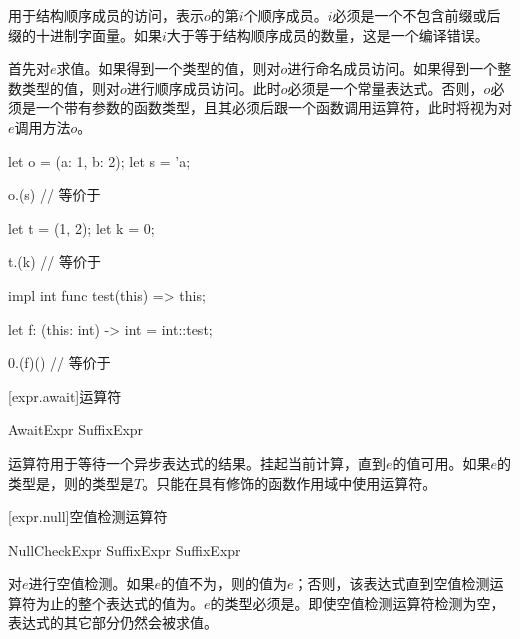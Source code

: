 \pnum
{}用于结构顺序成员的访问，表示$o$的第$i$个顺序成员。$i$必须是一个不包含前缀或后缀的十进制字面量。如果$i$大于等于结构顺序成员的数量，这是一个编译错误。

\pnum
{}首先对$e$求值。如果得到一个类型的值，则对$o$进行命名成员访问。如果得到一个整数类型的值，则对$o$进行顺序成员访问。此时$o$必须是一个常量表达式。否则，$o$必须是一个带有参数的函数类型，且其必须后跟一个函数调用运算符，此时将视为对$e$调用方法$o$。

\enterexample
\begin{codeblock}
let o = (a: 1, b: 2);
let s = 'a;

o.(s) // 等价于

let t = (1, 2);
let k = 0;

t.(k) // 等价于

impl int {
    func test(this) => this;
}

let f: (this: int) -> int = int::test;

0.(f)() // 等价于
\end{codeblock}
\exitexample

[expr.await]{运算符}

\begin{bnf}{AwaitExpr}
    SuffixExpr  
\end{bnf}

\pnum
{}运算符用于等待一个异步表达式的结果。挂起当前计算，直到$e$的值可用。如果$e$的类型是，则的类型是$T$。只能在具有修饰的函数作用域中使用运算符。

[expr.null]{空值检测运算符}

\begin{bnf}{NullCheckExpr}
    SuffixExpr  \br
    SuffixExpr \terminal{!}
\end{bnf}

\pnum
{}对$e$进行空值检测。如果$e$的值不为，则的值为$e$；否则，该表达式直到空值检测运算符为止的整个表达式的值为。$e$的类型必须是。即使空值检测运算符检测为空，表达式的其它部分仍然会被求值。

